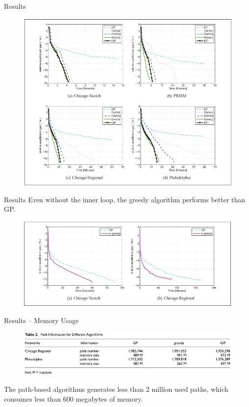 \documentclass{beamer}
\begin{document}
\begin{frame}{Results}
\begin{figure}
\includegraphics[scale=0.35]{./graph1.jpg}
\end{figure}
\end{frame}


\begin{frame}{Results}
Even without the inner loop, the greedy algorithm
performs better than GP.
\begin{figure}
\includegraphics[width=\textwidth]{./graph2.jpg}
\end{figure}
\end{frame}


\begin{frame}{Results -- Memory Usage}
\begin{figure}
\includegraphics[width=\textwidth]{./table1.jpg}
\end{figure}

The path-based algorithms generates less than $2$ million
used paths, which consumes less than $600$ megabytes of
memory.
\end{frame}
\end{document}
